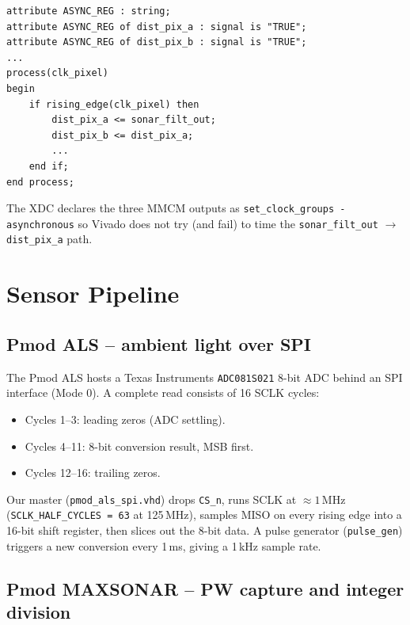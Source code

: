 \documentclass[11pt,a4paper]{article}
\begin{document}
\begin{lstlisting}[caption={CDC structure in \texttt{top\_threat\_system.vhd}}]
attribute ASYNC_REG : string;
attribute ASYNC_REG of dist_pix_a : signal is "TRUE";
attribute ASYNC_REG of dist_pix_b : signal is "TRUE";
...
process(clk_pixel)
begin
    if rising_edge(clk_pixel) then
        dist_pix_a <= sonar_filt_out;
        dist_pix_b <= dist_pix_a;
        ...
    end if;
end process;
\end{lstlisting}

The XDC declares the three MMCM outputs as
\texttt{set\_clock\_groups -asynchronous} so Vivado does not try (and
fail) to time the \texttt{sonar\_filt\_out} $\to$ \texttt{dist\_pix\_a}
path.

\section{Sensor Pipeline}

\subsection{Pmod ALS -- ambient light over SPI}

The Pmod ALS hosts a Texas Instruments \texttt{ADC081S021} 8-bit ADC
behind an SPI interface (Mode 0).  A complete read consists of 16 SCLK
cycles:

\begin{itemize}
  \item Cycles 1--3: leading zeros (ADC settling).
  \item Cycles 4--11: 8-bit conversion result, MSB first.
  \item Cycles 12--16: trailing zeros.
\end{itemize}

Our master (\texttt{pmod\_als\_spi.vhd}) drops \texttt{CS\_n}, runs SCLK
at $\approx 1$\,MHz (\texttt{SCLK\_HALF\_CYCLES = 63} at 125\,MHz),
samples MISO on every rising edge into a 16-bit shift register, then
slices out the 8-bit data.  A pulse generator
(\texttt{pulse\_gen}) triggers a new conversion every 1\,ms, giving a
1\,kHz sample rate.

\subsection{Pmod MAXSONAR -- PW capture and integer division}
\end{document}
